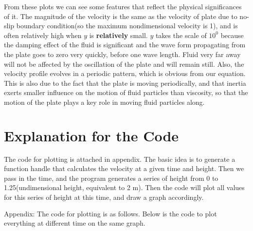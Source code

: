 \documentclass{article}
\begin{document}
  From these plots we can see some features that reflect the physical significances of it. The magnitude of the velocity is the same as the velocity of plate due to no-slip boundary condition(so the maximum nondimensional velocity is 1), and is often relatively high when $y$ is \textbf{relatively} small. $y$ takes the scale of $10^0$ because the damping effect of the fluid is significant and the wave form propagating from the plate goes to zero very quickly, before one wave length. Fluid very far away will not be affected by the oscillation of the plate and will remain still. Also, the velocity profile evolves in a periodic pattern, which is obvious from our equation. This is also due to the fact that the plate is moving periodically, and that inertia exerts smaller influence on the motion of fluid particles than viscosity, so that the motion of the plate plays a key role in moving fluid particles along.

\section{Explanation for the Code}
The code for plotting is attached in appendix. The basic idea is to generate a function handle that calculates the velocity at a given time and height. Then we pass in the time, and the program generates a series of height from 0 to 1.25(undimensional height, equivalent to 2 m). Then the code will plot all values for this series of height at this time, and draw a graph accordingly.

\clearpage
\appendix
Appendix:
The code for plotting is as follows.
Below is the code to plot everything at different time on the same graph.



%  
  
%
%
%
\end{document}
